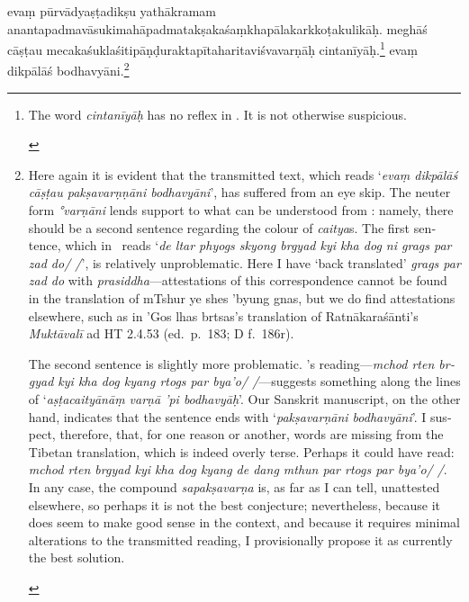 \documentclass[naipra.tex]{subfiles}
\begin{document}
\begin{sanskrit}

\pstart
evaṃ pūrvādyaṣṭadikṣu yathākramam ananta\dsh padma\dsh vāsuki\dsh mahāpadma\dsh takṣaka\dsh śaṃkhapāla\dsh karkkoṭa\dsh kulikāḥ.
meghāś cāṣṭau mecaka\dsh śukla\dsh śiti\dsh pāṇḍu\dsh rakta\dsh pīta\dsh harita\dsh viśvavarṇāḥ cintanīyāḥ.\footnote{\begin{english}
	The word \emph{cintanīyāḥ} has no reflex in \TIB .
	It is not otherwise suspicious.
\end{english}}
evaṃ dikpālāś  bodhavyāni.\footnote{\begin{english}
	Here again it is evident that the transmitted text, which reads `\emph{evaṃ dikpālāś cāṣṭau pakṣavarṇṇāni bodhavyāni}', has suffered from an eye skip.
	The neuter form \emph{°varṇāni} lends support to what can be understood from \TIB : namely, there should be a second sentence regarding the colour of \emph{caitya}s.
	The first sentence, which in \TIB\ reads `\emph{de ltar phyogs skyong brgyad kyi kha dog ni grags par zad do/ /}', is relatively unproblematic.
	Here I have `back translated' \emph{grags par zad do} with \emph{prasiddha}—attestations of this correspondence cannot be found in the translation of mTshur ye shes 'byung gnas, but we do find attestations elsewhere, such as in 'Gos lhas brtsas's translation of Ratnākaraśānti's \emph{Muktāvalī} ad HT 2.4.53 (ed.\ p.\ 183; D f.\ 186r).

	The second sentence is slightly more problematic. \TIB 's reading—\emph{mchod rten brgyad kyi kha dog kyang rtogs par bya'o/ /}—suggests something along the lines of `\emph{aṣṭacaityānāṃ varṇā 'pi bodhavyāḥ}'.
	Our Sanskrit manuscript, on the other hand, indicates that the sentence ends with `\emph{pakṣavarṇāni bodhavyāni}'.
	I suspect, therefore, that, for one reason or another, words are missing from the Tibetan translation, which is indeed overly terse.
	Perhaps it could have read: \emph{mchod rten brgyad kyi kha dog kyang de dang mthun par rtogs par bya'o/ /}.
	In any case, the compound \emph{sapakṣavarṇa} is, as far as I can tell, unattested elsewhere, so perhaps it is not the best conjecture; nevertheless, because it does seem to make good sense in the context, and because it requires minimal alterations to the transmitted reading, I provisionally propose it as currently the best solution. 
\end{english}}
\pend


\end{sanskrit}
\end{document}
